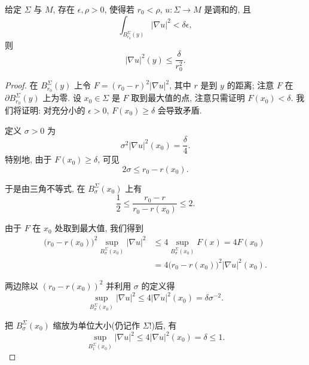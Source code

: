 \begin{theorem}
\label{thm:4.22}
给定 $\Sigma$ 与 $M$, 存在 $\epsilon,\rho>0$, 使得若 $r_0<\rho$,
$u:\Sigma\to M$ 是调和的, 且
\begin{equation}
\int_{B^\Sigma_{r_0}(y)}|\nabla u|^2<\delta\epsilon,
\label{eq:4.43}
\end{equation}
则
\begin{equation}
|\nabla u|^2(y)\leq\frac{\delta}{r_0^2}.
\label{eq:4.44}
\end{equation}
\end{theorem}

\begin{proof}
在 $B^\Sigma_{r_0}(y)$ 上令 $F=(r_0-r)^2|\nabla u|^2$, 其中 $r$ 是到
$y$ 的距离; 注意 $F$ 在 $\partial B^\Sigma_{r_0}(y)$ 上为零. 设
$x_0\in\Sigma$ 是 $F$ 取到最大值的点, 注意只需证明 $F(x_0)<\delta$.
我们将证明: 对充分小的 $\epsilon>0$, $F(x_0)\geq\delta$ 会导致矛盾.

定义 $\sigma>0$ 为
\begin{equation}
\sigma^2|\nabla u|^2(x_0)=\frac{\delta}{4}.
\label{eq:4.45}
\end{equation}
特别地, 由于 $F(x_0)\geq\delta$, 可见
\begin{equation}
2\sigma\leq r_0-r(x_0).
\label{eq:4.46}
\end{equation}

于是由三角不等式, 在 $B^\Sigma_\sigma(x_0)$ 上有
\begin{equation*}
\frac12\leq\frac{r_0-r}{r_0-r(x_0)}\leq2.
\end{equation*}

由于 $F$ 在 $x_0$ 处取到最大值, 我们得到
\begin{equation}
\begin{aligned}
\bigl(r_0-r(x_0)\bigr)^2\sup_{B^\Sigma_\sigma(x_0)}|\nabla u|^2
&\leq4\sup_{B^\Sigma_\sigma(x_0)}F(x)=4F(x_0)\\
&=4\bigl(r_0-r(x_0)\bigr)^2|\nabla u|^2(x_0).
\end{aligned}
\label{eq:4.47}
\end{equation}

两边除以 $(r_0-r(x_0))^2$ 并利用 $\sigma$ 的定义得
\begin{equation}
\sup_{B^\Sigma_\sigma(x_0)}|\nabla u|^2\leq4|\nabla u|^2(x_0)
 =\delta\sigma^{-2}.
\label{eq:4.48}
\end{equation}

把 $B^\Sigma_\sigma(x_0)$ 缩放为单位大小(仍记作 $\Sigma$!)后, 有
\begin{equation*}
\sup_{B^\Sigma_1(x_0)}|\nabla u|^2\leq4|\nabla u|^2(x_0)=\delta\leq1.
\end{equation*}


\end{proof}

